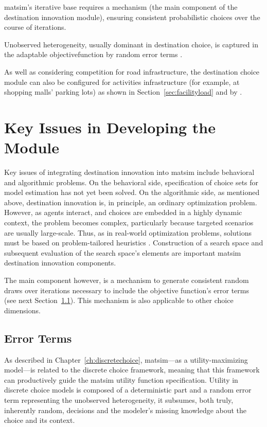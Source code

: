 \gls{matsim}'s iterative base requires a mechanism (the main component of the destination innovation module), ensuring consistent probabilistic choices over the course of iterations.

Unobserved heterogeneity, usually dominant in destination choice, is captured in the adaptable \gls{objectivefunction} by random error terms \citep[][]{%
HorniEtAl2011TrbLocationChoice,Horni_PhDThesis_2013}.

As well as considering competition for road infrastructure, the destination choice module can also be configured for activities infrastructure (for example, at shopping malls' parking lots) as shown in Section~\ref{sec:facilityload} and by \citet[][]{HorniEtAl_TRR_2009}.

\section{Key Issues in Developing the Module}
Key issues of integrating destination innovation into \gls{matsim} include behavioral and algorithmic problems. 
On the behavioral side, specification of choice sets for model estimation has not yet been solved. 
On the algorithmic side, as mentioned above, destination innovation is, in principle, an ordinary optimization problem. 
However, as agents interact, and choices are embedded in a highly dynamic context, the problem becomes complex, particularly because targeted scenarios are usually large-scale. 
Thus, as in real-world optimization problems, solutions must be based on problem-tailored heuristics \citep[][]{MichalewiczFogel_2004}. 
Construction of a search space and subsequent evaluation of the search space's elements are important \gls{matsim} destination innovation components. 

The main component however, is a mechanism to generate consistent random draws over iterations necessary to include the objective function's error terms (see next Section~\ref{sec:errorterms}). 
This mechanism is also applicable to other choice dimensions.

\subsection{Error Terms}
\label{sec:errorterms}
As described in Chapter~\ref{ch:discretechoice}, \gls{matsim}---as a utility-maximizing model---is related to the discrete choice framework, meaning that this framework can productively guide the \gls{matsim} utility function specification. 
Utility in discrete choice models is composed of a deterministic part and a random error term representing the unobserved heterogeneity, \ie it subsumes, both truly, \ie inherently random, decisions and the modeler's missing knowledge about the choice and its context. 

